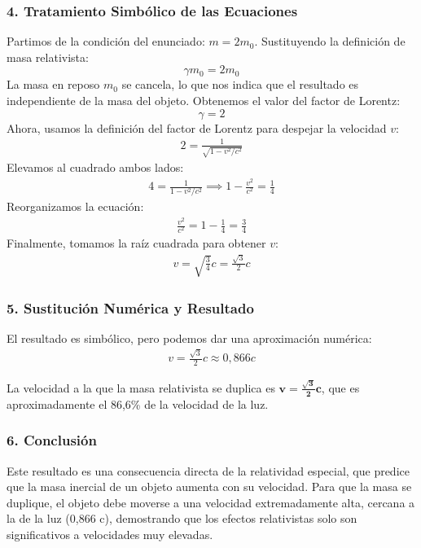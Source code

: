 \subsubsection*{4. Tratamiento Simbólico de las Ecuaciones}
Partimos de la condición del enunciado: $m = 2m_0$.
Sustituyendo la definición de masa relativista:
$$ \gamma m_0 = 2m_0 $$
La masa en reposo $m_0$ se cancela, lo que nos indica que el resultado es independiente de la masa del objeto. Obtenemos el valor del factor de Lorentz:
$$ \gamma = 2 $$
Ahora, usamos la definición del factor de Lorentz para despejar la velocidad $v$:
\begin{gather}
    2 = \frac{1}{\sqrt{1 - v^2/c^2}}
\end{gather}
Elevamos al cuadrado ambos lados:
\begin{gather}
    4 = \frac{1}{1 - v^2/c^2} \implies 1 - \frac{v^2}{c^2} = \frac{1}{4}
\end{gather}
Reorganizamos la ecuación:
\begin{gather}
    \frac{v^2}{c^2} = 1 - \frac{1}{4} = \frac{3}{4}
\end{gather}
Finalmente, tomamos la raíz cuadrada para obtener $v$:
\begin{gather}
    v = \sqrt{\frac{3}{4}} c = \frac{\sqrt{3}}{2} c
\end{gather}

\subsubsection*{5. Sustitución Numérica y Resultado}
El resultado es simbólico, pero podemos dar una aproximación numérica:
\begin{gather}
    v = \frac{\sqrt{3}}{2} c \approx 0,866 c
\end{gather}
\begin{cajaresultado}
    La velocidad a la que la masa relativista se duplica es $\boldsymbol{v = \frac{\sqrt{3}}{2} c}$, que es aproximadamente el 86,6\% de la velocidad de la luz.
\end{cajaresultado}

\subsubsection*{6. Conclusión}
\begin{cajaconclusion}
Este resultado es una consecuencia directa de la relatividad especial, que predice que la masa inercial de un objeto aumenta con su velocidad. Para que la masa se duplique, el objeto debe moverse a una velocidad extremadamente alta, cercana a la de la luz (0,866 c), demostrando que los efectos relativistas solo son significativos a velocidades muy elevadas.
\end{cajaconclusion}

